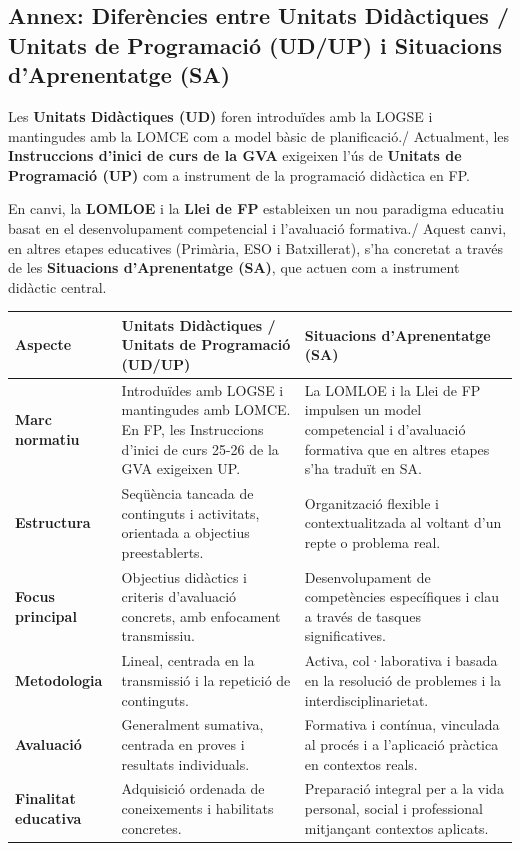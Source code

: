 \documentclass[
  paper=a4,
  ,captions=tableheading
]{scrartcl}
\begin{document}
\hypertarget{annex-diferuxe8ncies-entre-unitats-diduxe0ctiques-unitats-de-programaciuxf3-udup-i-situacions-daprenentatge-sa}{%
\subsection{Annex: Diferències entre Unitats Didàctiques / Unitats de
Programació (UD/UP) i Situacions d'Aprenentatge
(SA)}\label{annex-diferuxe8ncies-entre-unitats-diduxe0ctiques-unitats-de-programaciuxf3-udup-i-situacions-daprenentatge-sa}}

Les \textbf{Unitats Didàctiques (UD)} foren introduïdes amb la LOGSE i
mantingudes amb la LOMCE com a model bàsic de planificació./ Actualment,
les \textbf{Instruccions d'inici de curs de la GVA} exigeixen l'ús de
\textbf{Unitats de Programació (UP)} com a instrument de la programació
didàctica en FP.

En canvi, la \textbf{LOMLOE} i la \textbf{Llei de FP} estableixen un nou
paradigma educatiu basat en el desenvolupament competencial i
l'avaluació formativa./ Aquest canvi, en altres etapes educatives
(Primària, ESO i Batxillerat), s'ha concretat a través de les
\textbf{Situacions d'Aprenentatge (SA)}, que actuen com a instrument
didàctic central.

\begin{longtable}[]{@{}lll@{}}
\toprule
Aspecte & Unitats Didàctiques / Unitats de Programació (UD/UP) &
Situacions d'Aprenentatge (SA) \\
\midrule
\endhead
\textbf{Marc normatiu} & Introduïdes amb LOGSE i mantingudes amb LOMCE.
En FP, les Instruccions d'inici de curs 25-26 de la GVA exigeixen UP. &
La LOMLOE i la Llei de FP impulsen un model competencial i d'avaluació
formativa que en altres etapes s'ha traduït en SA. \\
\textbf{Estructura} & Seqüència tancada de continguts i activitats,
orientada a objectius preestablerts. & Organització flexible i
contextualitzada al voltant d'un repte o problema real. \\
\textbf{Focus principal} & Objectius didàctics i criteris d'avaluació
concrets, amb enfocament transmissiu. & Desenvolupament de competències
específiques i clau a través de tasques significatives. \\
\textbf{Metodologia} & Lineal, centrada en la transmissió i la repetició
de continguts. & Activa, col·laborativa i basada en la resolució de
problemes i la interdisciplinarietat. \\
\textbf{Avaluació} & Generalment sumativa, centrada en proves i
resultats individuals. & Formativa i contínua, vinculada al procés i a
l'aplicació pràctica en contextos reals. \\
\textbf{Finalitat educativa} & Adquisició ordenada de coneixements i
habilitats concretes. & Preparació integral per a la vida personal,
social i professional mitjançant contextos aplicats. \\
\bottomrule
\end{longtable}
\end{document}
